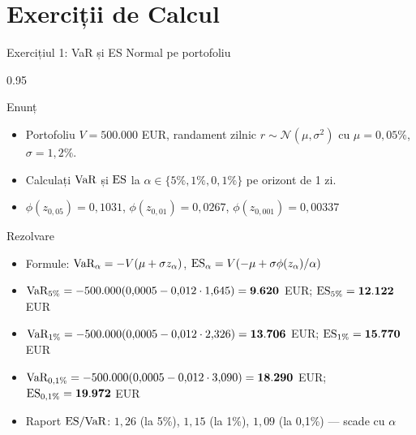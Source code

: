 \documentclass[9pt, aspectratio=169, t]{beamer}
\begin{document}
\section{Exerciții de Calcul}

\begin{frame}[shrink=10]{Exercițiul 1: VaR și ES Normal pe portofoliu}
    \begin{cminipage}{0.95\textwidth}
    \begin{block}{Enunț}
    \begin{itemize}\setlength{\itemsep}{0pt}
        \item Portofoliu $V = 500.000$ EUR, randament zilnic $r \sim \mathcal{N}(\mu, \sigma^2)$ cu $\mu = 0{,}05\%$, $\sigma = 1{,}2\%$.
        \item Calculați $\text{VaR}$ și $\text{ES}$ la $\alpha \in \{5\%, 1\%, 0{,}1\%\}$ pe orizont de 1 zi.
        \item $\phi(z_{0{,}05}) = 0{,}1031$, $\phi(z_{0{,}01}) = 0{,}0267$, $\phi(z_{0{,}001}) = 0{,}00337$
    \end{itemize}
    \end{block}
    \vspace{0.1cm}
    \begin{exampleblock}{Rezolvare}
    \begin{itemize}\setlength{\itemsep}{0pt}
        \item Formule: $\text{VaR}_\alpha = -V(\mu + \sigma z_\alpha)$, \quad $\text{ES}_\alpha = V(-\mu + \sigma \phi(z_\alpha)/\alpha)$
        \item $\text{VaR}_{5\%} = -500.000(0{,}0005 - 0{,}012 \cdot 1{,}645) = \mathbf{9.620}$ EUR; \quad $\text{ES}_{5\%} = \mathbf{12.122}$ EUR
        \item $\text{VaR}_{1\%} = -500.000(0{,}0005 - 0{,}012 \cdot 2{,}326) = \mathbf{13.706}$ EUR; \quad $\text{ES}_{1\%} = \mathbf{15.770}$ EUR
        \item $\text{VaR}_{0{,}1\%} = -500.000(0{,}0005 - 0{,}012 \cdot 3{,}090) = \mathbf{18.290}$ EUR; \quad $\text{ES}_{0{,}1\%} = \mathbf{19.972}$ EUR
        \item Raport $\text{ES}/\text{VaR}$: $1{,}26$ (la 5\%), $1{,}15$ (la 1\%), $1{,}09$ (la 0{,}1\%) --- scade cu $\alpha$
    \end{itemize}
    \end{exampleblock}
    \end{cminipage}
\end{frame}
\end{document}
